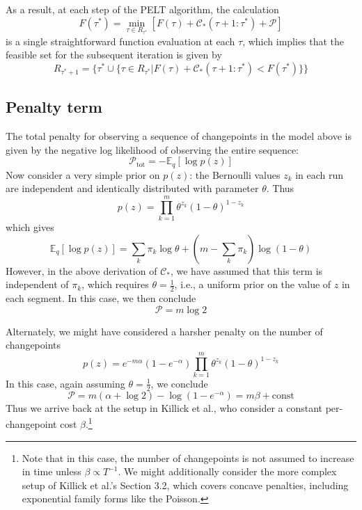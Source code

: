 \documentclass[11pt]{article}
\begin{document}
As a result, at each step of the PELT algorithm, the calculation
\begin{equation}
    F(\tau^*) = \min_{\tau \in R_{\tau^*}} [F(\tau) + \mathcal{C}_*(\tau + 1:\tau^*) + \mathcal{P}]
\end{equation}
is a single straightforward function evaluation at each $\tau$, which implies that the feasible set for the subsequent iteration is given by
\begin{equation}
    R_{\tau^* + 1} = \lbrace \tau^* \cup
    \lbrace
    \tau \in R_{\tau^*} \vert F(\tau) + \mathcal{C}_*(\tau + 1:\tau^*) <
    F(\tau^*)
    \rbrace \rbrace
\end{equation}

\subsection{Penalty term}
The total penalty for observing a sequence of changepoints in the model above is given by the negative log likelihood of observing the entire sequence:
\begin{equation}
    \mathcal{P}_\mathrm{tot} = -\mathbb{E}_q[\log p(z)]
\end{equation}
Now consider a very simple prior on $p(z)$: the Bernoulli values $z_k$ in each run are independent and identically distributed with parameter $\theta$. Thus
\begin{equation}
    p(z) = \prod_{k = 1}^m \theta^{z_k} (1 - \theta)^{1 - z_k}
\end{equation}
which gives
\begin{equation}
    \mathbb{E}_q[\log p(z)] = \sum_k \pi_k \log \theta
    + (m - \sum_k \pi_k)\log (1 - \theta)
\end{equation}
However, in the above derivation of $\mathcal{C}_*$, we have assumed that this term is independent of $\pi_k$, which requires $\theta = \frac{1}{2}$, i.e., a uniform prior on the value of $z$ in each segment. In this case, we then conclude
\begin{equation}
    \mathcal{P} = m \log 2
\end{equation}

Alternately, we might have considered a harsher penalty on the number of changepoints
\begin{equation}
    p(z) = e^{-m\alpha}(1 - e^{-\alpha})
    \prod_{k = 1}^m \theta^{z_k} (1 - \theta)^{1 - z_k}
\end{equation}
In this case, again assuming $\theta = \frac{1}{2}$, we conclude
\begin{equation}
    \mathcal{P} = m(\alpha + \log 2) - \log (1 - e^{-\alpha}) = m\beta + \text{const}
\end{equation}
Thus we arrive back at the setup in Killick et al., who consider a constant per-changepoint cost $\beta$.\footnote{Note that in this case, the number of changepoints is not assumed to increase in time unless $\beta \propto T^{-1}$. We might additionally consider the more complex setup of Killick et al.'s Section 3.2, which covers concave penalties, including exponential family forms like the Poisson.}
\end{document}
